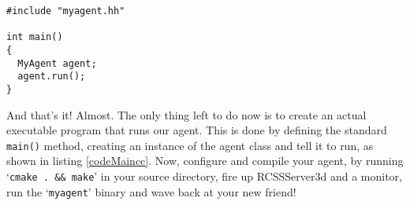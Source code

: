 \newpage

\begin{lstlisting}[float,caption={\tt main.cc},label=codeMaincc,frame=single]
#include "myagent.hh"

int main()
{
  MyAgent agent;
  agent.run();
}
\end{lstlisting}

And that's it! Almost. The only thing left to do now is to create an
actual executable program that runs our agent. This is done by
defining the standard {\tt main()} method, creating an instance of the
agent class and tell it to run, as shown in listing
\ref{codeMaincc}. Now, configure and compile your agent, by running
`{\tt cmake . \&\& make}' in your source directory, fire up RCSSServer3d
and a monitor, run the `{\tt myagent}' binary and wave back at your
new friend!

